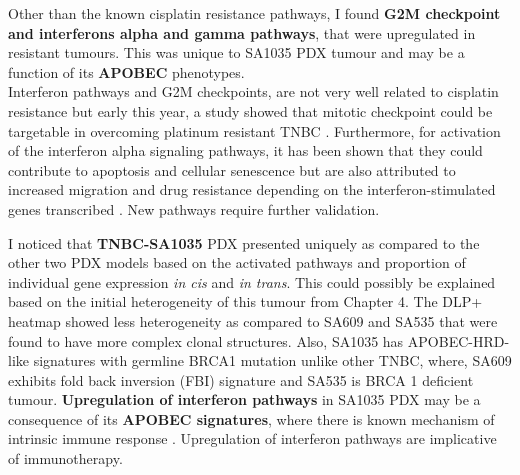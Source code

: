 Other than the known cisplatin resistance pathways, I found \textbf{G2M checkpoint and interferons alpha and gamma pathways}, that were upregulated in resistant tumours. This was unique to SA1035 PDX tumour and may be a function of its \textbf{APOBEC} phenotypes. 
\\
Interferon pathways and G2M checkpoints, are not very well related to cisplatin resistance but early this year, a study showed that mitotic checkpoint could be targetable in overcoming platinum resistant TNBC \cite{ moens2021mitotic}. Furthermore, for activation of the interferon alpha signaling pathways, it has been shown that they could contribute to apoptosis and cellular senescence but are also attributed to increased migration and drug resistance depending on the interferon-stimulated genes transcribed \cite{provance2019deciphering, mojic2018dark}. New pathways require further validation. 
 
 I noticed that \textbf{TNBC-SA1035} PDX presented uniquely as compared to the other two PDX models based on the activated pathways and proportion of individual gene expression \textit{in cis} and \textit{in trans}. 
This could possibly be explained based on the initial heterogeneity of this tumour from Chapter 4. The DLP+ heatmap showed less heterogeneity as compared to SA609 and SA535 that were found to have more complex clonal structures. 
Also, SA1035 has APOBEC-HRD-like signatures with germline BRCA1 mutation unlike other TNBC, where, SA609 exhibits fold back inversion (FBI) signature and SA535 is BRCA 1 deficient tumour. 
\textbf{Upregulation of interferon pathways} in SA1035 PDX may be a consequence of its \textbf{APOBEC signatures}, where there is known mechanism of intrinsic immune response \cite{wang2018apobec3b}. Upregulation of interferon pathways are implicative of immunotherapy.





